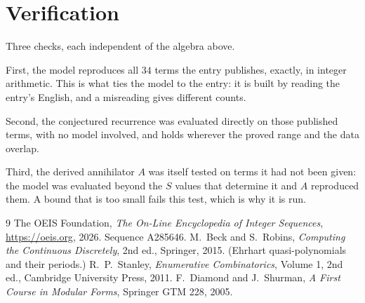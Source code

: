 \documentclass[11pt,a4paper]{article}
\theoremstyle{plain}
\theoremstyle{definition}
\begin{document}
\section{Verification}

Three checks, each independent of the algebra above.

First, the model reproduces all $34$ terms the entry publishes, exactly, in integer
arithmetic. This is what ties the model to the entry: it is built by reading the entry's
English, and a misreading gives different counts.

Second, the conjectured recurrence was evaluated directly on those published terms, with no
model involved, and holds wherever the proved range and the data overlap.

Third, the derived annihilator $A$ was itself tested on terms it had not been given: the model
was evaluated beyond the $S$ values that determine it and $A$ reproduced them. A bound that is
too small fails this test, which is why it is run.

\begin{thebibliography}{9}
 The OEIS Foundation, \emph{The On-Line Encyclopedia of Integer
Sequences}, \url{https://oeis.org}, 2026. Sequence A285646.
 M.~Beck and S.~Robins, \emph{Computing the Continuous Discretely},
2nd ed., Springer, 2015. (Ehrhart quasi-polynomials and their periods.)
 R.~P.~Stanley, \emph{Enumerative Combinatorics}, Volume 1, 2nd ed.,
Cambridge University Press, 2011.
 F.~Diamond and J.~Shurman, \emph{A First Course in Modular Forms},
Springer GTM 228, 2005.
\end{thebibliography}
\end{document}

